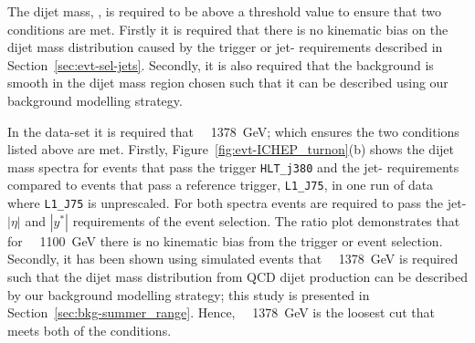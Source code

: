 

The dijet mass, \mjj{}, is required to be above a threshold value to ensure that two conditions are met.
Firstly it is required that there is no kinematic bias on the dijet mass distribution
caused by the trigger or jet-\pT{} requirements described in Section~\ref{sec:evt-sel-jets}.
Secondly, it is also required that the background is smooth in the dijet mass region chosen
such that it can be described using our background modelling strategy.

In the \summer{} data-set it is required that \mjj~\gt~1378~GeV;
which ensures the two conditions listed above are met.
Firstly, Figure~\ref{fig:evt-ICHEP_turnon}(b) shows the dijet mass spectra for events
that pass the trigger \verb|HLT_j380| and the \summer{} jet-\pT{} requirements
compared to events that pass a reference trigger, \verb|L1_J75|,
in one run of data where \verb|L1_J75| is unprescaled.
For both spectra events are required to pass the jet-$|\eta|$ and $|y^*|$ requirements of the \summer{} event selection.
The ratio plot demonstrates that for \mjj~\gt~1100~GeV there is no kinematic bias from the trigger or event selection.
Secondly, it has been shown using simulated events that
\mjj~\gt~1378~GeV is required such that the dijet mass distribution from QCD dijet production
can be described by our background modelling strategy;
this study is presented in Section~\ref{sec:bkg-summer_range}.
Hence, \mjj~\gt~1378~GeV is the loosest cut that meets both of the conditions.


